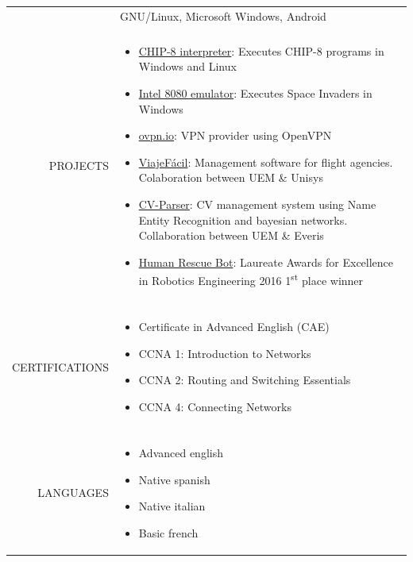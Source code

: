 \documentclass[a4paper, 11pt]{article}
\begin{document}
\begin{longtable}{rp{11cm}}
        & GNU/Linux, Microsoft Windows, Android\\
        \\
        PROJECTS
        & \vspace{-8mm}
        \begin{itemize}[leftmargin=0cm,label={}]
            \item \href{https://github.com/hugo19941994/CHIP8-Emu}{CHIP-8 interpreter}: Executes CHIP-8 programs in Windows and Linux
            \item \href{https://github.com/hugo19941994/SpaceInvaders-Emu}{Intel 8080 emulator}: Executes Space Invaders in Windows
            \item \href{https://ovpn.io}{ovpn.io}: VPN provider using OpenVPN
            \item \href{https://github.com/hugo19941994/ViajeFacil}{ViajeFácil}: Management software for flight agencies. Colaboration between UEM \& Unisys
            \item \href{https://github.com/hugo19941994/CV-Parser}{CV-Parser}: CV management system using Name Entity Recognition and bayesian networks. Collaboration between UEM \& Everis
            \item \href{https://github.com/hugo19941994/robot}{Human Rescue Bot}: Laureate Awards for Excellence in Robotics Engineering 2016 1\textsuperscript{st} place winner
        \end{itemize}\\
        \\
        CERTIFICATIONS
        & \vspace{-8mm}
        \begin{itemize}[leftmargin=0cm,label={},noitemsep]
            \item Certificate in Advanced English (CAE)
            \item CCNA 1: Introduction to Networks
            \item CCNA 2: Routing and Switching Essentials
            \item CCNA 4: Connecting Networks
        \end{itemize}\\
        \\
        LANGUAGES
        & \vspace{-8mm}
        \begin{itemize}[leftmargin=0cm,label={},noitemsep]
            \item Advanced english
            \item Native spanish
            \item Native italian
            \item Basic french
        \end{itemize}
    \end{longtable}
\end{document}
